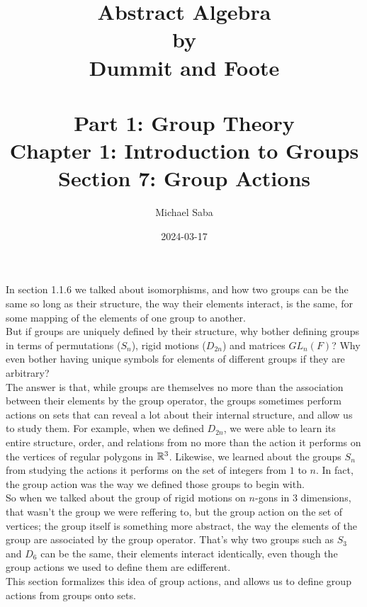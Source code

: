 \documentclass[12pt]{article}
\title{%
    \Huge Abstract Algebra \\
    \large by \\
    \Large Dummit and Foote \\~\\
    \huge Part 1: Group Theory \\
    \LARGE Chapter 1: Introduction to Groups \\
    \Large Section 7: Group Actions
}
\date{2024-03-17}
\author{Michael Saba}
\begin{document}
    \maketitle
    \newpage
    \setlength{\parindent}{0pt}

    In section 1.1.6 we talked about isomorphisms,
    and how two groups can be the same so long as their structure,
    the way their elements interact, is the same,
    for some mapping of the elements of one group to another. \\
    But if groups are uniquely defined by their structure,
    why bother defining groups in terms of permutations ($S_n$),
    rigid motions ($D_{2n}$) and matrices $GL_n(F)$?
    Why even bother having unique symbols for elements of different
    groups if they are arbitrary? \\
    The answer is that, while groups are themselves no more than
    the association between their elements by the group operator,
    the groups sometimes perform actions on sets that can reveal
    a lot about their internal structure,
    and allow us to study them.
    For example, when we defined $D_{2n}$,
    we were able to learn its entire structure, order,
    and relations from no more than the action it performs on the vertices
    of regular polygons in $\mathbb{R}^3$. 
    Likewise, we learned about the groups $S_n$ from studying
    the actions it performs on the set of integers from $1$ to $n$.
    In fact, the group action was the way we defined those groups
    to begin with. \\
    So when we talked about the group of rigid motions on $n$-gons
    in $3$ dimensions,
    that wasn't the group we were reffering to,
    but the group action on the set of vertices;
    the group itself is something more abstract,
    the way the elements of the group are associated
    by the group operator.
    That's why two groups such as $S_3$ and $D_6$ can be the same,
    their elements interact identically,
    even though the group actions we used to define them are edifferent. \\
    This section formalizes this idea of group actions,
    and allows us to define group actions from groups onto sets. \\
\end{document}
